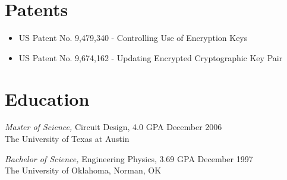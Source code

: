 \documentclass[overlapped]{res}
\begin{document}
\begin{resume}
\section{Patents}
\begin{itemize}
    \item US Patent No. 9,479,340 - Controlling Use of Encryption Keys
    \item US Patent No. 9,674,162 - Updating Encrypted Cryptographic Key Pair
\end{itemize}
\section{Education} 
{\sl Master of Science,} Circuit Design, 4.0 GPA \hfill December 2006\\
                The University of Texas at Austin                 

{\sl Bachelor of Science,} Engineering Physics, 3.69 GPA \hfill December 1997\\
                The University of Oklahoma, Norman, OK\\
\end{resume}
\end{document}

